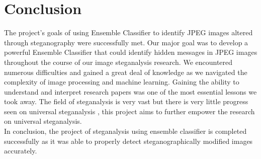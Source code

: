 \chapter{Conclusion}
The project's goals of using Ensemble Classifier to identify JPEG images altered through steganography were successfully met. Our major goal was to develop a powerful Ensemble Classifier that could identify hidden messages in JPEG images throughout the course of our image steganalysis research. We encountered numerous difficulties and gained a great deal of knowledge as we navigated the complexity of image processing and machine learning. Gaining the ability to understand and interpret research papers was one of the most essential lessons we took away. The field of steganalysis is very vast but there is very little progress seen on universal steganalysis , this project aims to further empower the research on universal steganalysis.\\
In conclusion, the project of steganalysis using ensemble classifier is completed \mbox{successfully} as it was able to properly detect steganographically modified images accurately.

\clearpage



